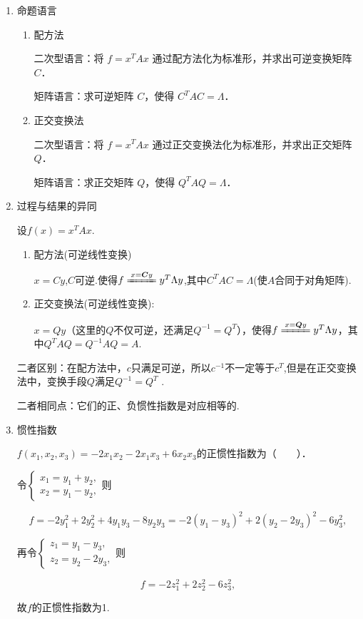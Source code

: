 \begin{enumerate}
    \item 命题语言
          \DTwoTwo
          \begin{enumerate}
              \item 配方法

                    二次型语言：将 $f = x^T A x$ 通过配方法化为标准形，并求出可逆变换矩阵 $C$．

                    矩阵语言：求可逆矩阵 $C$，使得 $C^T A C = \Lambda$．
              \item 正交变换法

                    二次型语言：将 $f = x^T A x$ 通过正交变换法化为标准形，并求出正交矩阵 $Q$．

                    矩阵语言：求正交矩阵 $Q$，使得 $Q^T A Q = \Lambda$．
          \end{enumerate}
    \item 过程与结果的异同
          \DTwoThree

          设$f(x)=x^TAx$.
          \begin{enumerate}
              \item 配方法(可逆线性变换)

                    $x=Cy$,$C$可逆.使得$f\xlongequal{x=\boldsymbol{C}y}y^T\Lambda y$,其中$C^TAC=\Lambda$(使$A$合同于对角矩阵).
              \item 正交变换法(可逆线性变换):

                    $x=Qy$（这里的$Q$不仅可逆，还满足$Q^{-1}=Q^{T}$），使得$f\xlongequal{x=\boldsymbol{Q}y}y^T\Lambda y$，其中$Q^{T}AQ=Q^{-1}AQ=A$.
          \end{enumerate}
          二者区别：在配方法中，$c$只满足可逆，所以$c^{-1}$不一定等于$c^T$,但是在正交变换法中，变换手段$Q$满足$Q^{- 1}= Q^T$ .

          二者相同点：它们的正、负惯性指数是对应相等的.
    \item 惯性指数
          \begin{example}{}{}
              $f(x_{1},x_{2},x_{3})=-2x_{1}x_{2}-2x_{1}x_{3}+6x_{2}x_{3}$的正惯性指数为（　　）．
          \end{example}
          \begin{solution}
              令$\begin{cases}x_{1}=y_{1}+y_{2},\\x_{2}=y_{1}-y_{2},\end{cases}$则

              $$f=-2y_{1}^{2}+2y_{2}^{2}+4y_{1}y_{3}-8y_{2}y_{3}
                  =-2(y_{1}-y_{3})^{2}+2(y_{2}-2y_{3})^{2}-6y_{3}^{2},$$

              再令$\begin{cases}z_{1}=y_{1}-y_{3},\\z_{2}=y_{2}-2y_{3},\end{cases}$则

              $$f=-2z_{1}^{2}+2z_{2}^{2}-6z_{3}^{2},$$

              故$f$的正惯性指数为1.
          \end{solution}
\end{enumerate}

